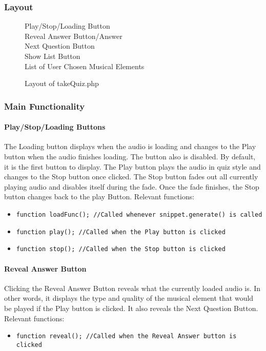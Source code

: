 \documentclass{article}
\begin{document}
\subsubsection{Layout}
\begin{figure}[H]
    \centering
    Play/Stop/Loading Button\\
    Reveal Answer Button/Answer \\
    Next Question Button \\
    Show List Button \\
    List of User Chosen Musical Elements \\
    \caption{Layout of takeQuiz.php}
    \label{fig:takeQuiz}
\end{figure}

\subsubsection{Main Functionality}
\paragraph{Play/Stop/Loading Buttons}
The Loading button displays when the audio is loading and changes to the Play button when the audio finishes loading. The button also is disabled. By default, it is the first button to display. The Play button plays the audio in quiz style and changes to the Stop button once clicked. The Stop button fades out all currently playing audio and disables itself during the fade. Once the fade finishes, the Stop button changes back to the play Button.
\vskip 3mm
\noindent Relevant functions:
\begin{itemize}
\item \texttt{function loadFunc(); //Called whenever snippet.generate() is called}
\item \texttt{function play(); //Called when the Play button is clicked}
\item \texttt{function stop(); //Called when the Stop button is clicked}
\end{itemize}

\paragraph{Reveal Answer Button}
Clicking the Reveal Answer Button reveals what the currently loaded audio is. In other words, it displays the type and quality of the musical element that would be played if the Play button is clicked. It also reveals the Next Question Button.
\vskip 3mm
\noindent Relevant functions:
\begin{itemize}
\item \texttt{function reveal(); //Called when the Reveal Answer button is clicked}
\end{itemize}
\end{document}
